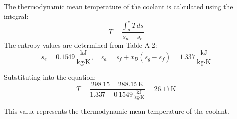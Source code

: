 The thermodynamic mean temperature of the coolant is calculated using the integral:  
\[
T = \frac{\int_a^e T \, ds}{s_a - s_e}
\]  
The entropy values are determined from Table A-2:  
\[
s_e = 0.1549 \, \frac{\text{kJ}}{\text{kg·K}}, \quad s_a = s_f + x_D \left( s_g - s_f \right) = 1.337 \, \frac{\text{kJ}}{\text{kg·K}}
\]  

Substituting into the equation:  
\[
T = \frac{298.15 - 288.15 \, \text{K}}{1.337 - 0.1549 \, \frac{\text{kJ}}{\text{kg·K}}} = 26.17 \, \text{K}
\]  

This value represents the thermodynamic mean temperature of the coolant.